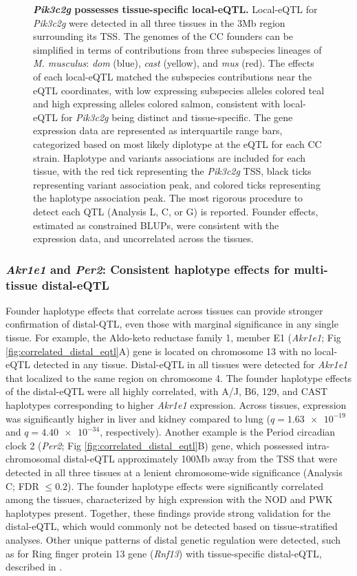 \documentclass[10pt,letterpaper]{article}
\begin{document}
\begin{figure}[h!]
\caption{\textbf{\textit{Pik3c2g} possesses tissue-specific local-eQTL.} Local-eQTL for \textit{Pik3c2g} were detected in all three tissues in the 3Mb region surrounding its TSS. The genomes of the CC founders can be simplified in terms of contributions from three subspecies lineages of \textit{M. musculus}: \textit{dom} (blue), \textit{cast} (yellow), and \textit{mus} (red). The effects of each local-eQTL matched the subspecies contributions near the eQTL coordinates, with low expressing subspecies alleles colored teal and high expressing alleles colored salmon, consistent with local-eQTL for \textit{Pik3c2g} being distinct and tissue-specific. The gene expression data are represented as interquartile range bars, categorized based on most likely diplotype at the eQTL for each CC strain. Haplotype and variants associations are included for each tissue, with the red tick representing the \textit{Pik3c2g} TSS, black ticks representing variant association peak, and colored ticks representing the haplotype association peak. The most rigorous procedure to detect each QTL (Analysis L, C, or G) is reported. Founder effects, estimated as constrained BLUPs, were consistent with the expression data, and uncorrelated across the tissues.
\label{fig:pik3c2g}}
\end{figure}

\subsubsection*{\textit{Akr1e1} and \textit{Per2}: Consistent haplotype effects for multi-tissue distal-eQTL}
Founder haplotype effects that correlate across tissues can provide stronger confirmation of distal-QTL, even those with marginal significance in any single tissue. 
For example, the Aldo-keto reductase family 1, member E1 (\textit{Akr1e1}; Fig \ref{fig:correlated_distal_eqtl}A) gene is located on chromosome 13 with no local-eQTL detected in any tissue. Distal-eQTL in all tissues were detected for \textit{Akr1e1} that localized to the same region on chromosome 4. The founder haplotype effects of the distal-eQTL were all highly correlated, with A/J, B6, 129, and CAST haplotypes corresponding to higher \textit{Akr1e1} expression. Across tissues, expression was significantly higher in liver and kidney compared to lung ($q = \num{1.63e-19}$ and $q = \num{4.40e-34}$, respectively).
Another example is the Period circadian clock 2 (\textit{Per2}; Fig \ref{fig:correlated_distal_eqtl}B) gene, which possessed intra-chromosomal distal-eQTL approximately 100Mb away from the TSS that were detected in all three tissues at a lenient chromosome-wide significance (Analysis C; FDR $\le 0.2$). The founder haplotype effects were significantly correlated among the tissues, characterized by high expression with the NOD and PWK haplotypes present. Together, these findings provide strong validation for the distal-eQTL, which would commonly not be detected based on tissue-stratified analyses.
Other unique patterns of distal genetic regulation were detected, such as for Ring finger protein 13 gene (\textit{Rnf13}) with tissue-specific distal-eQTL, described in .
\end{document}
